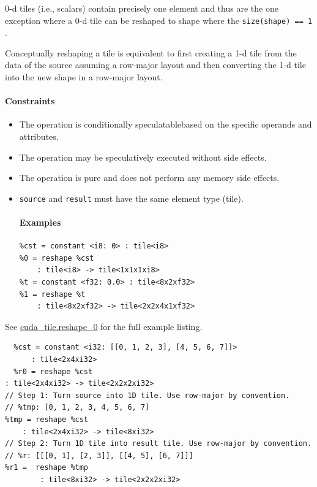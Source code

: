 \documentclass{article}
\begin{document}
0-d tiles (i.e., scalars) contain precisely one element and thus are the one exception where a 0-d tile can be reshaped to shape where the \texttt{size(shape) == 1} .


Conceptually reshaping a tile is equivalent to first creating a 1-d tile from the data of the source assuming a row-major layout and then converting the 1-d tile into the new shape in a row-major layout.



\paragraph{Constraints}

\begin{itemize}
\item The operation is conditionally speculatablebased on the specific operands and attributes.
\item The operation may be speculatively executed without side effects.
\item The operation is pure and does not perform any memory side effects.
\item \texttt{source} and \texttt{result} must have the same element type (tile).


\paragraph{Examples}

\begin{lstlisting}
%cst = constant <i8: 0> : tile<i8>
%0 = reshape %cst
    : tile<i8> -> tile<1x1x1xi8>
%t = constant <f32: 0.0> : tile<8x2xf32>
%1 = reshape %t
    : tile<8x2xf32> -> tile<2x2x4x1xf32>
\end{lstlisting}

\end{itemize}
See \href{https://docs.nvidia.com/cuda/tile-ir/latest/sections/appendix.html#example-cuda-tile-reshape-0}{cuda\_tile.reshape\_0} for the full example listing.


\begin{lstlisting}
  %cst = constant <i32: [[0, 1, 2, 3], [4, 5, 6, 7]]>
      : tile<2x4xi32>
  %r0 = reshape %cst
: tile<2x4xi32> -> tile<2x2x2xi32>
// Step 1: Turn source into 1D tile. Use row-major by convention.
// %tmp: [0, 1, 2, 3, 4, 5, 6, 7]
%tmp = reshape %cst
    : tile<2x4xi32> -> tile<8xi32>
// Step 2: Turn 1D tile into result tile. Use row-major by convention.
// %r: [[[0, 1], [2, 3]], [[4, 5], [6, 7]]]
%r1 =  reshape %tmp
        : tile<8xi32> -> tile<2x2x2xi32>
\end{lstlisting}
\end{document}
